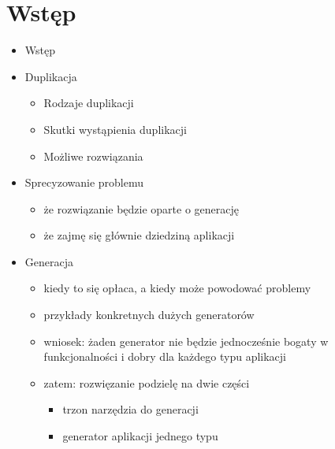 \chapter{Wstęp} \label{chap:intro}

\begin{itemize}

 \item Wstęp
 
 \item Duplikacja
  \begin{itemize}
   \item Rodzaje duplikacji
   \item Skutki wystąpienia duplikacji
   \item Możliwe rozwiązania
  \end{itemize}
 
 \item Sprecyzowanie problemu
  \begin{itemize}
   \item że rozwiązanie będzie oparte o generację
   \item że zajmę się głównie dziedziną aplikacji
  \end{itemize}
 
 \item Generacja
  \begin{itemize}
   \item kiedy to się opłaca, a kiedy może powodować problemy
   \item przykłady konkretnych dużych generatorów
   \item wniosek: żaden generator nie będzie jednocześnie bogaty w funkcjonalności i dobry dla każdego typu aplikacji
   \item zatem: rozwięzanie podzielę na dwie części
    \begin{itemize}
     \item trzon narzędzia do generacji
     \item generator aplikacji jednego typu
    \end{itemize}
  \end{itemize}


\end{itemize}
